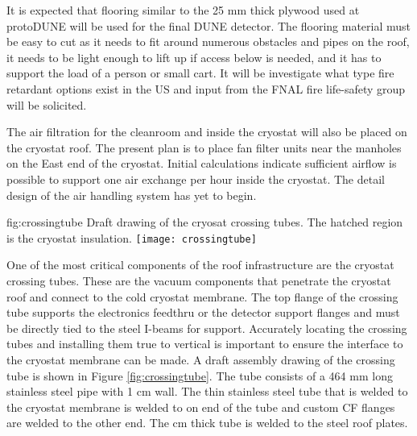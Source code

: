 It is expected that flooring similar to the 25 \si{mm} thick plywood used at protoDUNE will be used for the final DUNE detector. 
The flooring material must be easy to cut as it needs to fit around numerous obstacles and pipes on the roof, it needs to be light enough to lift up if access below is needed, and it has to support the load of a person or small cart. 
It will be investigate what type fire retardant options exist in the US and input from the FNAL fire life-safety group will be solicited. 

The air filtration for the cleanroom and inside the cryostat will also be placed on the cryostat roof. The present plan is to place fan filter units near the manholes on the East end of the cryostat. Initial calculations indicate sufficient airflow is possible to support one air exchange per hour inside the cryostat. The detail design of the air handling system has yet to begin.


\begin{dunefigure}{fig:crossingtube}
  {Draft drawing of the cryosat crossing tubes. The hatched region is the cryostat insulation.}
\texttt{[image: crossingtube]}
\end{dunefigure}

One of the most critical components of the roof infrastructure are the cryostat crossing tubes. These are the vacuum components that penetrate the cryostat roof and connect to the cold cryostat membrane. The top flange of the crossing tube supports the electronics feedthru or the detector support flanges and must be directly tied to the steel I-beams for support. Accurately locating the crossing tubes and installing them true to vertical is important to ensure the interface to the cryostat membrane can be made. A draft assembly drawing of the crossing tube is shown in Figure \ref{fig:crossingtube}. The tube consists of a 464 \si{mm} long stainless steel pipe with 1 \si{cm} wall. The thin stainless steel tube that is welded to the cryostat membrane is welded to on end of the tube and custom CF flanges are welded to the other end. The \si{cm} thick tube is welded to the steel roof plates.


